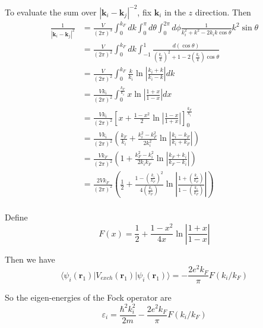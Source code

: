 \documentclass{article}
\begin{document}
To evaluate the sum over $|\mathbf{k}_i-\mathbf{k}_j|^{-2}$, fix $\mathbf{k}_i$ in the $z$ direction. Then
\begin{align*}
\frac{1}{|\mathbf{k}_i-\mathbf{k}_j|^2}&=\frac{V}{(2\pi)^3}\int_0^{k_F}dk\int_0^\pi d\theta\int_0^{2\pi}d\phi\frac{1}{k_i^2+k^2-2k_ik\cos\theta}k^2\sin\theta\\
&=\frac{V}{(2\pi)^2}\int_0^{k_F}dk\int_{-1}^1\frac{d(\cos\theta)}{\left(\frac{k_i}{k}\right)^2+1-2\left(\frac{k_i}{k}\right)\cos\theta}\\
&=\frac{V}{(2\pi)^2}\int_0^{k_F}\frac{k}{k_i}\ln\left|\frac{k_i+k}{k_i-k}\right|dk\\
&=\frac{Vk_i}{(2\pi)^2}\int_0^{\frac{k_F}{k_i}}x\ln\left|\frac{1+x}{1-x}\right|dx\\
&=\frac{Vk_i}{(2\pi)^2}\left[x+\frac{1-x^2}{2}\ln\left|\frac{1-x}{1+x}\right|\right]_0^{\frac{k_F}{k_i}}\\
&=\frac{Vk_i}{(2\pi)^2}\left(\frac{k_F}{k_i}+\frac{k_i^2-k_F^2}{2k_i^2}\ln\left|\frac{k_i-k_F}{k_i+k_F}\right|\right)\\
&=\frac{Vk_F}{(2\pi)^2}\left(1+\frac{k_F^2-k_i^2}{2k_ik_F}\ln\left|\frac{k_F+k_i}{k_F-k_i}\right|\right)\\
&=\frac{2Vk_F}{(2\pi)^2}\left(\frac{1}{2}+\frac{1-\left(\frac{k_i}{k_F}\right)^2}{4\left(\frac{k_i}{k_F}\right)}\ln\left|\frac{1+\left(\frac{k_i}{k_F}\right)}{1-\left(\frac{k_i}{k_F}\right)}\right|\right)\\
\end{align*}

Define
\begin{equation*}
F(x)=\frac{1}{2}+\frac{1-x^2}{4x}\ln\left|\frac{1+x}{1-x}\right|
\end{equation*}

Then we have
\begin{equation*}
\langle\psi_i(\mathbf{r}_1)|V_{exch}(\mathbf{r}_1)|\psi_i(\mathbf{r}_1)\rangle=-\frac{2e^2k_F}{\pi}F(k_i/k_F)
\end{equation*}

So the eigen-energies of the Fock operator are
\begin{equation*}
\varepsilon_i=\frac{\hbar^2k_i^2}{2m}-\frac{2e^2k_F}{\pi}F(k_i/k_F)
\end{equation*}
\end{document}

